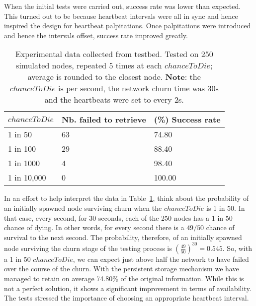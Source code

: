When the initial tests were carried out\cite{shinebourne2022availability}, success rate was lower than expected. This turned out to be because heartbeat intervals were all in sync and hence inspired the design for heartbeat palpitations. Once palpitations were introduced and hence the intervals offset, success rate improved greatly.

\begin{table}[ht]
    \centering
    \begin{tabular}{|l|l|l|}
        \hline
        $chanceToDie$ & Nb. failed to retrieve & (\%) Success rate \\
        \hline
        1 in 50       & 63                     & 74.80             \\
        1 in 100      & 29                     & 88.40             \\
        1 in 1000     & 4                      & 98.40             \\
        1 in 10,000   & 0                      & 100.00            \\
        \hline
    \end{tabular}
    \caption{Experimental data collected from testbed. Tested on 250 simulated nodes, repeated 5 times at each $chanceToDie$; average is rounded to the closest node. \textbf{Note}: the $chanceToDie$ is per second, the network churn time was 30s and the heartbeats were set to every 2s.}
    \label{tab:chanceToDieResults}
\end{table}

In an effort to help interpret the data in Table~\ref{tab:chanceToDieResults}, think about the probability of an initially spawned node surviving churn when the $chanceToDie$ is 1 in 50. In that case, every second, for 30 seconds, each of the 250 nodes has a 1 in 50 chance of dying. In other words, for every second there is a $49/50$ chance of survival to the next second. The probability, therefore, of an initially spawned node surviving the churn stage of the testing process is $(\frac{49}{50})^{30}=0.545$. So, with a 1 in 50 $chanceToDie$, we can expect just above half the network to have failed over the course of the churn. With the persistent storage mechanism we have managed to retain on average 74.80\% of the original information. While this is not a perfect solution, it shows a significant improvement in terms of availability. The tests stressed the importance of choosing an appropriate heartbeat interval.

